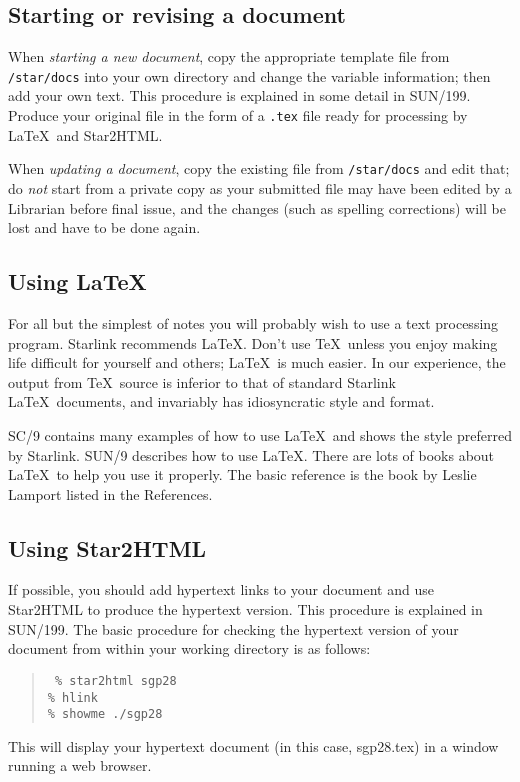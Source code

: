 \documentclass[twoside,11pt]{article}
\newcommand{\xref}[3]{#1}
\begin{document}
\subsection{Starting or revising a document}

When {\em starting a new document}, copy the appropriate template file from 
{\tt /star/docs}
into your own directory and change the variable information; then add your
own text.
This procedure is explained in some detail in
\xref{SUN/199}{sun199}{}.
Produce your original file in the form of a {\tt .tex} file ready for
processing by \LaTeX\ and Star2HTML.

When {\em updating a document}, copy the existing file from {\tt /star/docs}
and edit that; do {\em not} start from a private copy as your submitted file
may have been edited by a Librarian before final issue, and the
changes (such as spelling corrections) will be lost and have to be done again.

\subsection{Using \LaTeX}

For all but the simplest of notes you will probably wish to use a text
processing program.
Starlink recommends {\LaTeX}.
Don't use \TeX\ unless you enjoy making life difficult for yourself and
others; \LaTeX\ is much easier.
In our experience, the output from \TeX\ source is inferior to that of
standard Starlink \LaTeX\ documents, and invariably has idiosyncratic style and
format.

\xref{SC/9}{sc9}{}
contains many examples of how to use \LaTeX\ and shows the style preferred by
Starlink.
\xref{SUN/9}{sun9}{} describes how to use \LaTeX.
There are lots of books about \LaTeX\ to help you use it properly.
The basic reference is the book by Leslie Lamport listed in the References.

\subsection{Using Star2HTML}

If possible, you should add hypertext links to your document and use
Star2HTML to produce the hypertext version.
This procedure is explained in \xref{SUN/199}{sun199}{}.
The basic procedure for checking the hypertext version of your document
from within your working directory is as follows:
\begin{quote}
{\tt
\% star2html sgp28\\
\% hlink\\
\% showme ./sgp28}
\end{quote}
This will display your hypertext document (in this case, sgp28.tex) in a window
running a web browser.
\end{document}
